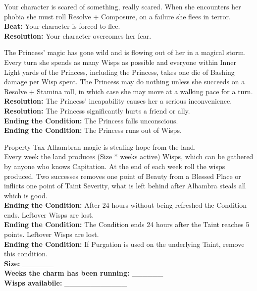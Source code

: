 \documentclass[10pt, frontgrid, backgrid]{flacards}
\begin{document}

{Your character is scared of something, really scared. When she encounters her phobia she must roll Resolve + Composure, on a failure she flees in terror. \\
\textbf{Beat:} Your character is forced to flee.\\
\textbf{Resolution:} Your character overcomes her fear.}



{
The Princess' magic has gone wild and is flowing out of her in a magical storm. Every turn she spends as many Wisps as possible and everyone within Inner Light yards of the Princess, including the Princess, takes one die of Bashing damage per Wisp spent. The Princess may do nothing unless she succeeds on a Resolve + Stamina roll, in which case she may move at a walking pace for a turn.\\

\textbf{Resolution:} The Princess' incapability causes her a serious inconvenience.\\
\textbf{Resolution:} The Princess significantly hurts a friend or ally.\\
\textbf{Ending the Condition:} The Princess falls unconscious.\\
\textbf{Ending the Condition:} The Princess runs out of Wisps.}

\Cond
{Property Tax}
{Alhambran magic is stealing hope from the land.\\
Every week the land produces (Size * weeks active) Wisps, which can be gathered by anyone who knows Capitation. At the end of each week roll the wisps produced. Two successes removes one point of Beauty from a Blessed Place or inflicts one point of Taint Severity, what is left behind after Alhambra steals all which is good. \\
\textbf{Ending the Condition:} After 24 hours without being refreshed the Condition ends. Leftover Wisps are lost.\\
\textbf{Ending the Condition:} The Condition ends 24 hours after the Taint reaches 5 points. Leftover Wisps are lost.\\
\textbf{Ending the Condition:} If Purgation is used on the underlying Taint, remove this condition.\\
\textbf{Size:} \_\_\_\_\_\_\\
\textbf{Weeks the charm has been running:} \_\_\_\_\_\_\\
\textbf{Wisps availabile:} \_\_\_\_\_\_\_\_\_\_\_\_}
\end{document}
